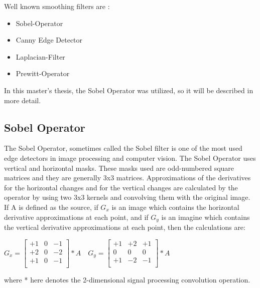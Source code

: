 Well known smoothing filters are :

\begin{itemize}

 \item Sobel-Operator
 \item Canny Edge Detector
 \item Laplacian-Filter
 \item Prewitt-Operator
 
 \end{itemize}
 
In this master's thesis, the Sobel Operator was utilized, so it will be described in more detail.

%
\subsection{Sobel Operator}\label{sec:Sobel Operator}

The Sobel Operator, sometimes called the Sobel filter is one of the most used edge detectors in image processing and computer vision. The Sobel Operator uses vertical and horizontal masks. These masks used are odd-numbered square matrices and they are generally 3x3 matrices. Approximations of the derivatives for the horizontal changes and for the vertical changes are calculated by the operator by using two 3x3 kernels and convolving them with the original image. If A is defined as the source, if $G_{x}$ is an image which contains the horizontal derivative approximations at each point, and if $G_{y}$ is an imagine which contains the vertical derivative approximations at each point, then the calculations are:

\begin{center}

$  G_{x} = 
  \begin{bmatrix}
	+1 & 0 & -1 \\
	+2 & 0 & -2 \\
	+1 & 0 & -1 \\
   \end{bmatrix} * A  \quad
  G_{y} = 
  \begin{bmatrix}
	+1 & +2 & +1 \\
	0 & 0 & 0 \\
	+1 & -2 & -1 \\
  \end{bmatrix} * A		$

\end{center}

where * here denotes the 2-dimensional signal processing convolution operation.

